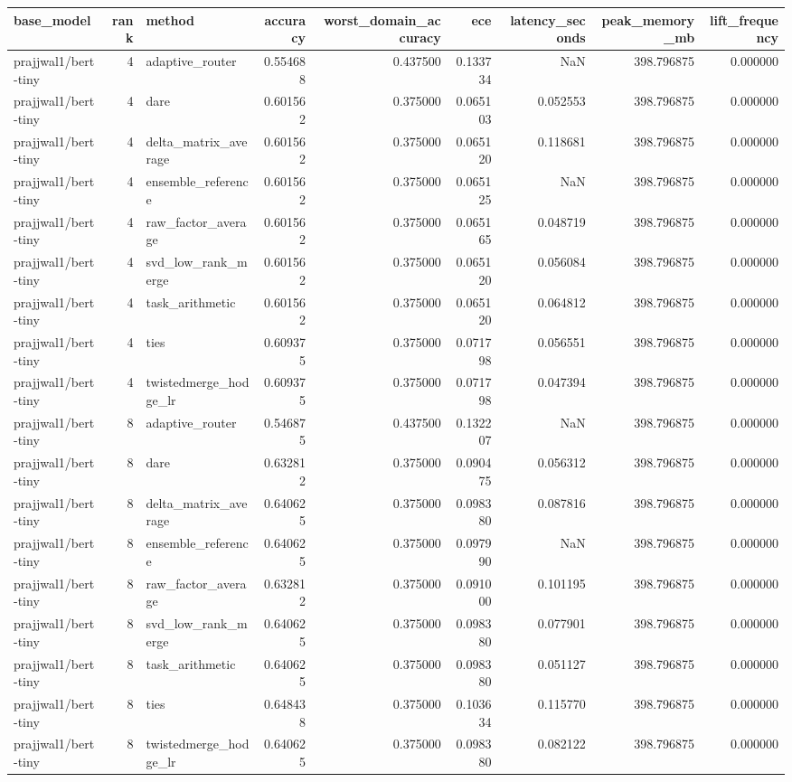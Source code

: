 \begin{tabular}{lrlrrrrrr}
\toprule
base_model & rank & method & accuracy & worst_domain_accuracy & ece & latency_seconds & peak_memory_mb & lift_frequency \\
\midrule
prajjwal1/bert-tiny & 4 & adaptive_router & 0.554688 & 0.437500 & 0.133734 & NaN & 398.796875 & 0.000000 \\
prajjwal1/bert-tiny & 4 & dare & 0.601562 & 0.375000 & 0.065103 & 0.052553 & 398.796875 & 0.000000 \\
prajjwal1/bert-tiny & 4 & delta_matrix_average & 0.601562 & 0.375000 & 0.065120 & 0.118681 & 398.796875 & 0.000000 \\
prajjwal1/bert-tiny & 4 & ensemble_reference & 0.601562 & 0.375000 & 0.065125 & NaN & 398.796875 & 0.000000 \\
prajjwal1/bert-tiny & 4 & raw_factor_average & 0.601562 & 0.375000 & 0.065165 & 0.048719 & 398.796875 & 0.000000 \\
prajjwal1/bert-tiny & 4 & svd_low_rank_merge & 0.601562 & 0.375000 & 0.065120 & 0.056084 & 398.796875 & 0.000000 \\
prajjwal1/bert-tiny & 4 & task_arithmetic & 0.601562 & 0.375000 & 0.065120 & 0.064812 & 398.796875 & 0.000000 \\
prajjwal1/bert-tiny & 4 & ties & 0.609375 & 0.375000 & 0.071798 & 0.056551 & 398.796875 & 0.000000 \\
prajjwal1/bert-tiny & 4 & twistedmerge_hodge_lr & 0.609375 & 0.375000 & 0.071798 & 0.047394 & 398.796875 & 0.000000 \\
prajjwal1/bert-tiny & 8 & adaptive_router & 0.546875 & 0.437500 & 0.132207 & NaN & 398.796875 & 0.000000 \\
prajjwal1/bert-tiny & 8 & dare & 0.632812 & 0.375000 & 0.090475 & 0.056312 & 398.796875 & 0.000000 \\
prajjwal1/bert-tiny & 8 & delta_matrix_average & 0.640625 & 0.375000 & 0.098380 & 0.087816 & 398.796875 & 0.000000 \\
prajjwal1/bert-tiny & 8 & ensemble_reference & 0.640625 & 0.375000 & 0.097990 & NaN & 398.796875 & 0.000000 \\
prajjwal1/bert-tiny & 8 & raw_factor_average & 0.632812 & 0.375000 & 0.091000 & 0.101195 & 398.796875 & 0.000000 \\
prajjwal1/bert-tiny & 8 & svd_low_rank_merge & 0.640625 & 0.375000 & 0.098380 & 0.077901 & 398.796875 & 0.000000 \\
prajjwal1/bert-tiny & 8 & task_arithmetic & 0.640625 & 0.375000 & 0.098380 & 0.051127 & 398.796875 & 0.000000 \\
prajjwal1/bert-tiny & 8 & ties & 0.648438 & 0.375000 & 0.103634 & 0.115770 & 398.796875 & 0.000000 \\
prajjwal1/bert-tiny & 8 & twistedmerge_hodge_lr & 0.640625 & 0.375000 & 0.098380 & 0.082122 & 398.796875 & 0.000000 \\
\bottomrule
\end{tabular}

